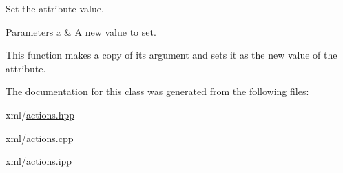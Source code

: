 Set the attribute value. 


\begin{DoxyParams}{Parameters}
{\em x} & A new value to set.\\
\hline
\end{DoxyParams}
This function makes a copy of its argument and sets it as the new value of the attribute. 

The documentation for this class was generated from the following files:\begin{DoxyCompactItemize}
\item 
xml/\hyperlink{actions_8hpp}{actions.hpp}\item 
xml/actions.cpp\item 
xml/actions.ipp\end{DoxyCompactItemize}
